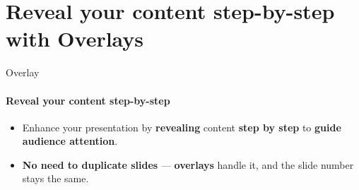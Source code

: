 \documentclass[aspectratio=169]{beamer}
\begin{document}
\section{Reveal your content step-by-step with \textbf{Overlays}}

\begin{frame}
\end{frame}

\begin{frame}{Overlay}
    \framesubtitle{Reveal your content step-by-step}

    \vspace{-0.7cm}
    \begin{coloredblockleft}
        \begin{itemize}
            \item \footnotesize Enhance your presentation by \textbf{revealing} content \textbf{step by step} to \textbf{guide audience attention}.
            \item \footnotesize \textbf{No need to duplicate slides} — \textbf{overlays} handle it, and the slide number stays the same.
        \end{itemize}
    \end{coloredblockleft}


\end{frame}
\end{document}

